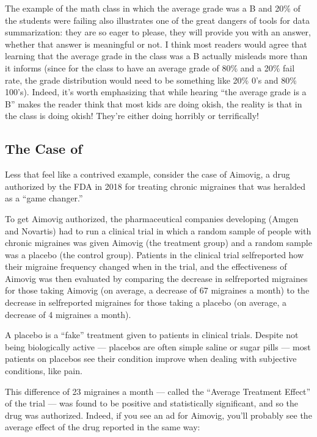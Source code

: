 \documentclass[letterpaper,10pt,english]{jupyterBook}
\begin{document}
\sphinxAtStartPar
The example of the math class in which the average grade was a B\sphinxhyphen{} and 20\% of the students were failing also illustrates one of the great dangers of tools for data summarization: they are so eager to please, they will  provide you with an answer, whether that answer is meaningful or not. I think most readers would agree that learning that the average grade in the class was a B\sphinxhyphen{} actually misleads more than it informs (since for the class to have an average grade of 80\% and a 20\% fail rate, the grade distribution would need to be something like 20\% 0’s and 80\% 100’s). Indeed, it’s worth emphasizing that while hearing “the average grade is a B\sphinxhyphen{}” makes the reader think that most kids are doing ok\sphinxhyphen{}ish, the reality is that  in the class is doing ok\sphinxhyphen{}ish! They’re either doing horribly or terrifically!


\subsection{The Case of }
\label{\detokenize{30_questions/18_exploratory_internal_faithful:the-case-of-aimovig}}
\sphinxAtStartPar
Less that feel like a contrived example, consider the case of Aimovig, a drug authorized by the FDA in 2018 for treating chronic migraines that was heralded as a “game changer.”

\sphinxAtStartPar
To get Aimovig authorized, the pharmaceutical companies developing (Amgen and Novartis) had to run a clinical trial in which a random sample of people with chronic migraines was given Aimovig (the treatment group) and a random sample was a placebo (the control group). Patients in the clinical trial self\sphinxhyphen{}reported how their migraine frequency changed when in the trial, and the effectiveness of Aimovig was then evaluated by comparing the decrease in self\sphinxhyphen{}reported migraines for those taking Aimovig (on average, a decrease of 6\sphinxhyphen{}7 migraines a month) to the decrease in self\sphinxhyphen{}reported migraines for those taking a placebo (on average, a decrease of 4 migraines a month).%
\begin{footnote}[1]\sphinxAtStartFootnote
A placebo is a “fake” treatment given to patients in clinical trials. Despite not being biologically active — placebos are often simple saline or sugar pills — most patients on placebos see their condition improve when dealing with subjective conditions, like pain.
%
\end{footnote} This difference of 2\sphinxhyphen{}3 migraines a month — called the “Average Treatment Effect” of the trial — was found to be positive and statistically significant, and so the drug was authorized. Indeed, if you see an ad for Aimovig, you’ll probably see the average effect of the drug reported in the same way:
\end{document}
